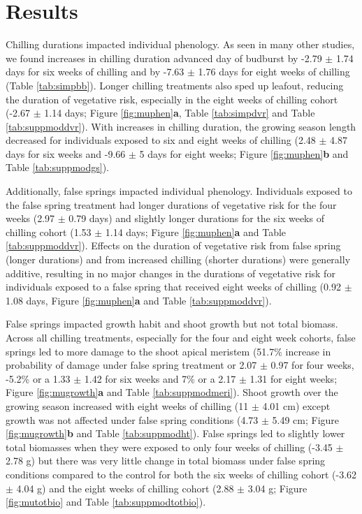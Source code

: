 \documentclass{article}\usepackage[]{graphicx}\usepackage[]{color}
\begin{document}
\section*{Results}
Chilling durations impacted individual phenology. As seen in many other studies, we found increases in chilling duration advanced day of budburst by -2.79 $\pm$ 1.74 days for six weeks of chilling and by -7.63 $\pm$ 1.76 days for eight weeks of chilling (Table \ref{tab:simpbb}). Longer chilling treatments also sped up leafout, reducing the duration of vegetative risk, especially in the eight weeks of chilling cohort (-2.67 $\pm$ 1.14 days; Figure \ref{fig:muphen}\textbf{a}, Table \ref{tab:simpdvr} and Table \ref{tab:suppmoddvr}). With increases in chilling duration, the growing season length decreased for individuals exposed to six and eight weeks of chilling (2.48 $\pm$ 4.87 days for six weeks and -9.66 $\pm$ 5 days for eight weeks; Figure \ref{fig:muphen}\textbf{b} and Table \ref{tab:suppmodgs}).
 
Additionally, false springs impacted individual phenology. Individuals exposed to the false spring treatment had longer durations of vegetative risk for the four weeks (2.97 $\pm$ 0.79 days) and slightly longer durations for the six weeks of chilling cohort (1.53 $\pm$ 1.14 days; Figure \ref{fig:muphen}\textbf{a} and Table \ref{tab:suppmoddvr}). Effects on the duration of vegetative risk from false spring (longer durations) and from increased chilling (shorter durations) were generally additive, resulting in no major changes in the durations of vegetative risk for individuals exposed to a false spring that received eight weeks of chilling (0.92 $\pm$ 1.08 days, Figure \ref{fig:muphen}\textbf{a} and Table \ref{tab:suppmoddvr}). 
  
False springs impacted growth habit and shoot growth but not total biomass. Across all chilling treatments, especially for the four and eight week cohorts, false springs led to more damage to the shoot apical meristem (51.7\% increase in probability of damage under false spring treatment or 2.07 $\pm$ 0.97 for four weeks, -5.2\% or a 1.33 $\pm$ 1.42 for six weeks and 7\% or a 2.17 $\pm$ 1.31 for eight weeks; Figure \ref{fig:mugrowth}\textbf{a} and Table \ref{tab:suppmodmeri}). Shoot growth over the growing season increased with eight weeks of chilling (11 $\pm$ 4.01 cm) except growth was not affected under false spring conditions (4.73 $\pm$ 5.49 cm; Figure \ref{fig:mugrowth}\textbf{b} and Table \ref{tab:suppmodht}). False springs led to slightly lower total biomasses when they were exposed to only four weeks of chilling (-3.45 $\pm$ 2.78 g) but there was very little change in total biomass under false spring conditions compared to the control for both the six weeks of chilling cohort (-3.62 $\pm$ 4.04 g) and the eight weeks of chilling cohort (2.88 $\pm$ 3.04 g; Figure \ref{fig:mutotbio} and Table \ref{tab:suppmodtotbio}).
  
\end{document}
